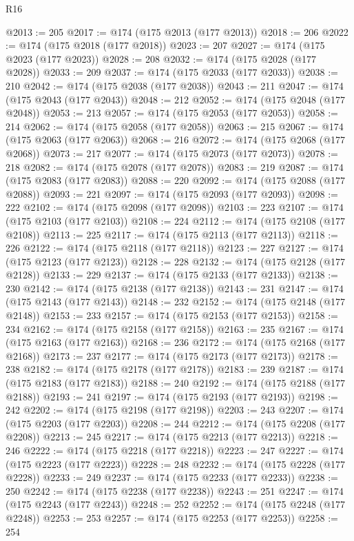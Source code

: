 \begin{lexlean}{R16}
\begin{coremodule}
@2013 := 205
@2017 := @174 (@175 @2013 (@177 @2013))
@2018 := 206
@2022 := @174 (@175 @2018 (@177 @2018))
@2023 := 207
@2027 := @174 (@175 @2023 (@177 @2023))
@2028 := 208
@2032 := @174 (@175 @2028 (@177 @2028))
@2033 := 209
@2037 := @174 (@175 @2033 (@177 @2033))
@2038 := 210
@2042 := @174 (@175 @2038 (@177 @2038))
@2043 := 211
@2047 := @174 (@175 @2043 (@177 @2043))
@2048 := 212
@2052 := @174 (@175 @2048 (@177 @2048))
@2053 := 213
@2057 := @174 (@175 @2053 (@177 @2053))
@2058 := 214
@2062 := @174 (@175 @2058 (@177 @2058))
@2063 := 215
@2067 := @174 (@175 @2063 (@177 @2063))
@2068 := 216
@2072 := @174 (@175 @2068 (@177 @2068))
@2073 := 217
@2077 := @174 (@175 @2073 (@177 @2073))
@2078 := 218
@2082 := @174 (@175 @2078 (@177 @2078))
@2083 := 219
@2087 := @174 (@175 @2083 (@177 @2083))
@2088 := 220
@2092 := @174 (@175 @2088 (@177 @2088))
@2093 := 221
@2097 := @174 (@175 @2093 (@177 @2093))
@2098 := 222
@2102 := @174 (@175 @2098 (@177 @2098))
@2103 := 223
@2107 := @174 (@175 @2103 (@177 @2103))
@2108 := 224
@2112 := @174 (@175 @2108 (@177 @2108))
@2113 := 225
@2117 := @174 (@175 @2113 (@177 @2113))
@2118 := 226
@2122 := @174 (@175 @2118 (@177 @2118))
@2123 := 227
@2127 := @174 (@175 @2123 (@177 @2123))
@2128 := 228
@2132 := @174 (@175 @2128 (@177 @2128))
@2133 := 229
@2137 := @174 (@175 @2133 (@177 @2133))
@2138 := 230
@2142 := @174 (@175 @2138 (@177 @2138))
@2143 := 231
@2147 := @174 (@175 @2143 (@177 @2143))
@2148 := 232
@2152 := @174 (@175 @2148 (@177 @2148))
@2153 := 233
@2157 := @174 (@175 @2153 (@177 @2153))
@2158 := 234
@2162 := @174 (@175 @2158 (@177 @2158))
@2163 := 235
@2167 := @174 (@175 @2163 (@177 @2163))
@2168 := 236
@2172 := @174 (@175 @2168 (@177 @2168))
@2173 := 237
@2177 := @174 (@175 @2173 (@177 @2173))
@2178 := 238
@2182 := @174 (@175 @2178 (@177 @2178))
@2183 := 239
@2187 := @174 (@175 @2183 (@177 @2183))
@2188 := 240
@2192 := @174 (@175 @2188 (@177 @2188))
@2193 := 241
@2197 := @174 (@175 @2193 (@177 @2193))
@2198 := 242
@2202 := @174 (@175 @2198 (@177 @2198))
@2203 := 243
@2207 := @174 (@175 @2203 (@177 @2203))
@2208 := 244
@2212 := @174 (@175 @2208 (@177 @2208))
@2213 := 245
@2217 := @174 (@175 @2213 (@177 @2213))
@2218 := 246
@2222 := @174 (@175 @2218 (@177 @2218))
@2223 := 247
@2227 := @174 (@175 @2223 (@177 @2223))
@2228 := 248
@2232 := @174 (@175 @2228 (@177 @2228))
@2233 := 249
@2237 := @174 (@175 @2233 (@177 @2233))
@2238 := 250
@2242 := @174 (@175 @2238 (@177 @2238))
@2243 := 251
@2247 := @174 (@175 @2243 (@177 @2243))
@2248 := 252
@2252 := @174 (@175 @2248 (@177 @2248))
@2253 := 253
@2257 := @174 (@175 @2253 (@177 @2253))
@2258 := 254

\end{coremodule}
\end{lexlean}
